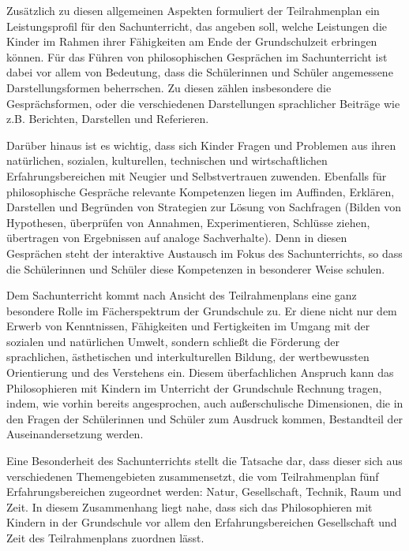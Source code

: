 Zusätzlich zu diesen allgemeinen Aspekten formuliert der Teilrahmenplan ein Leistungsprofil für den Sachunterricht, das angeben soll, welche Leistungen die Kinder im Rahmen ihrer Fähigkeiten am Ende der Grundschulzeit erbringen können. 
Für das Führen von philosophischen Gesprächen im Sachunterricht ist dabei vor allem von Bedeutung, dass die Schülerinnen und Schüler \glqq angemessene Darstellungsformen\grqq{}\cite[S.\,8]{MBFJ06} beherrschen.
Zu diesen zählen insbesondere die Gesprächsformen, oder die verschiedenen Darstellungen sprachlicher Beiträge wie z.B. Berichten, Darstellen und Referieren.

Darüber hinaus ist es wichtig, dass sich Kinder \glqq Fragen und Problemen aus ihren natürlichen, sozialen, kulturellen, technischen und wirtschaftlichen Erfahrungsbereichen mit Neugier und Selbstvertrauen\grqq{}\cite[S.\,8]{MBFJ06} zuwenden. 
Ebenfalls für philosophische Gespräche relevante Kompetenzen liegen im \glqq Auffinden, Erklären, Darstellen und Begründen von Strategien zur Lösung von Sachfragen (Bilden von Hypothesen, überprüfen von Annahmen, Experimentieren, Schlüsse ziehen, übertragen von Ergebnissen auf analoge Sachverhalte).\grqq{}\cite[S.\,8]{MBFJ06}
Denn in diesen Gesprächen steht der interaktive Austausch im Fokus des Sachunterrichts, so dass die Schülerinnen und Schüler diese Kompetenzen in besonderer Weise schulen.

Dem Sachunterricht kommt nach Ansicht des Teilrahmenplans eine ganz besondere Rolle im Fächerspektrum der Grundschule zu. 
Er diene \glqq nicht nur dem Erwerb von Kenntnissen, Fähigkeiten und Fertigkeiten im Umgang mit der sozialen und natürlichen Umwelt, sondern schließt die Förderung der sprachlichen, ästhetischen und interkulturellen Bildung, der wertbewussten Orientierung und des Verstehens ein.\grqq{}\cite[S.\,9]{MBFJ06} 
Diesem überfachlichen Anspruch kann das Philosophieren mit Kindern im Unterricht der Grundschule Rechnung tragen, indem, wie vorhin bereits angesprochen, auch außerschulische Dimensionen, die in den Fragen der Schülerinnen und Schüler zum Ausdruck kommen, Bestandteil der Auseinandersetzung werden.

Eine Besonderheit des Sachunterrichts stellt die Tatsache dar, dass dieser sich aus verschiedenen Themengebieten zusammensetzt, die vom Teilrahmenplan fünf Erfahrungsbereichen zugeordnet werden: Natur, Gesellschaft, Technik, Raum und Zeit. 
In diesem Zusammenhang liegt nahe, dass sich das Philosophieren mit Kindern in der Grundschule vor allem den Erfahrungsbereichen \glqq Gesellschaft\grqq{} und \glqq Zeit\grqq{} des Teilrahmenplans zuordnen lässt. 

